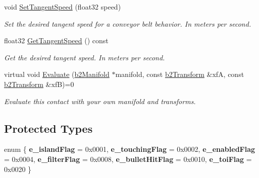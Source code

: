 \begin{DoxyCompactItemize}
\mbox{\label{classb2_contact_a32033914a6c7f35b469e8fddbc17c566}} 
void \hyperlink{classb2_contact_a32033914a6c7f35b469e8fddbc17c566}{Set\+Tangent\+Speed} (float32 speed)
\begin{DoxyCompactList}\small\item\em Set the desired tangent speed for a conveyor belt behavior. In meters per second. \end{DoxyCompactList}\item 
\mbox{\label{classb2_contact_a927125db0b36947a3bb53c4e3eded1cd}} 
float32 \hyperlink{classb2_contact_a927125db0b36947a3bb53c4e3eded1cd}{Get\+Tangent\+Speed} () const
\begin{DoxyCompactList}\small\item\em Get the desired tangent speed. In meters per second. \end{DoxyCompactList}\item 
\mbox{\label{classb2_contact_ae3c2842e5325b2d4500f8ed1d4de2f72}} 
virtual void \hyperlink{classb2_contact_ae3c2842e5325b2d4500f8ed1d4de2f72}{Evaluate} (\hyperlink{structb2_manifold}{b2\+Manifold} $\ast$manifold, const \hyperlink{structb2_transform}{b2\+Transform} \&xfA, const \hyperlink{structb2_transform}{b2\+Transform} \&xfB)=0
\begin{DoxyCompactList}\small\item\em Evaluate this contact with your own manifold and transforms. \end{DoxyCompactList}\end{DoxyCompactItemize}
\subsection*{Protected Types}
\begin{DoxyCompactItemize}
\item 
\mbox{\label{classb2_contact_ab8f00a9c04b3eea54a9c5bab29328c3e}} 
enum \{ \newline
{\bfseries e\+\_\+island\+Flag} = 0x0001, 
{\bfseries e\+\_\+touching\+Flag} = 0x0002, 
{\bfseries e\+\_\+enabled\+Flag} = 0x0004, 
{\bfseries e\+\_\+filter\+Flag} = 0x0008, 
\newline
{\bfseries e\+\_\+bullet\+Hit\+Flag} = 0x0010, 
{\bfseries e\+\_\+toi\+Flag} = 0x0020
 \}
\end{DoxyCompactItemize}
